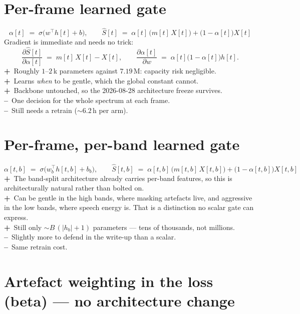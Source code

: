 \documentclass[11pt,a4paper]{article}
\newcommand{\pro}{\textbf{\textsf{+}}~}
\newcommand{\con}{\textbf{\textsf{--}}~}
\begin{document}
\section{Per-frame learned gate}
\[
\alpha[t] \;=\; \sigma\!\big(w^{\!\top} h[t] + b\big),
\qquad
\hat{S}[t] \;=\; \alpha[t]\,\big(m[t]\,X[t]\big) + \big(1-\alpha[t]\big)X[t]
\]
Gradient is immediate and needs no trick:
\[
\frac{\partial \hat{S}[t]}{\partial \alpha[t]} \;=\; m[t]\,X[t] - X[t],
\qquad
\frac{\partial \alpha[t]}{\partial w} \;=\; \alpha[t]\big(1-\alpha[t]\big)h[t].
\]
\pro Roughly $1$--$2$\,k parameters against $7.19$\,M: capacity risk negligible.\\
\pro Learns \emph{when} to be gentle, which the global constant cannot.\\
\pro Backbone untouched, so the 2026-08-28 architecture freeze survives.\\
\con One decision for the whole spectrum at each frame.\\
\con Still needs a retrain (${\sim}6.2$\,h per arm).

\section{Per-frame, per-band learned gate}
\[
\alpha[t,b] \;=\; \sigma\!\big(w_b^{\!\top} h[t,b] + b_b\big),
\qquad
\hat{S}[t,b] \;=\; \alpha[t,b]\,\big(m[t,b]\,X[t,b]\big) + \big(1-\alpha[t,b]\big)X[t,b]
\]
\pro The band-split architecture already carries per-band features, so this is
architecturally natural rather than bolted on.\\
\pro Can be gentle in the high bands, where masking artefacts live, and
aggressive in the low bands, where speech energy is. That is a distinction no
scalar gate can express.\\
\pro Still only ${\sim}B\,(|h_b|+1)$ parameters --- tens of thousands, not millions.\\
\con Slightly more to defend in the write-up than a scalar.\\
\con Same retrain cost.

\section{Artefact weighting in the loss (beta) --- no architecture change}
\end{document}
